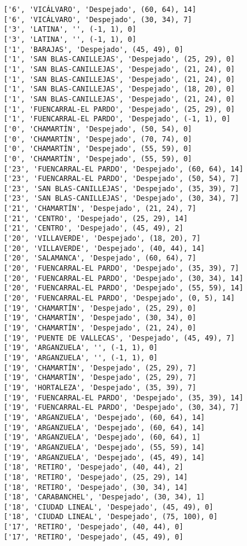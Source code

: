 \documentclass[11pt]{article}
\begin{document}
\begin{Verbatim}[commandchars=\\\{\}]
['6', 'VICÁLVARO', 'Despejado', (60, 64), 14]
['6', 'VICÁLVARO', 'Despejado', (30, 34), 7]
['3', 'LATINA', '', (-1, 1), 0]
['3', 'LATINA', '', (-1, 1), 0]
['1', 'BARAJAS', 'Despejado', (45, 49), 0]
['1', 'SAN BLAS-CANILLEJAS', 'Despejado', (25, 29), 0]
['1', 'SAN BLAS-CANILLEJAS', 'Despejado', (21, 24), 0]
['1', 'SAN BLAS-CANILLEJAS', 'Despejado', (21, 24), 0]
['1', 'SAN BLAS-CANILLEJAS', 'Despejado', (18, 20), 0]
['1', 'SAN BLAS-CANILLEJAS', 'Despejado', (21, 24), 0]
['1', 'FUENCARRAL-EL PARDO', 'Despejado', (25, 29), 0]
['1', 'FUENCARRAL-EL PARDO', 'Despejado', (-1, 1), 0]
['0', 'CHAMARTÍN', 'Despejado', (50, 54), 0]
['0', 'CHAMARTÍN', 'Despejado', (70, 74), 0]
['0', 'CHAMARTÍN', 'Despejado', (55, 59), 0]
['0', 'CHAMARTÍN', 'Despejado', (55, 59), 0]
['23', 'FUENCARRAL-EL PARDO', 'Despejado', (60, 64), 14]
['23', 'FUENCARRAL-EL PARDO', 'Despejado', (50, 54), 7]
['23', 'SAN BLAS-CANILLEJAS', 'Despejado', (35, 39), 7]
['23', 'SAN BLAS-CANILLEJAS', 'Despejado', (30, 34), 7]
['21', 'CHAMARTÍN', 'Despejado', (21, 24), 7]
['21', 'CENTRO', 'Despejado', (25, 29), 14]
['21', 'CENTRO', 'Despejado', (45, 49), 2]
['20', 'VILLAVERDE', 'Despejado', (18, 20), 7]
['20', 'VILLAVERDE', 'Despejado', (40, 44), 14]
['20', 'SALAMANCA', 'Despejado', (60, 64), 7]
['20', 'FUENCARRAL-EL PARDO', 'Despejado', (35, 39), 7]
['20', 'FUENCARRAL-EL PARDO', 'Despejado', (30, 34), 14]
['20', 'FUENCARRAL-EL PARDO', 'Despejado', (55, 59), 14]
['20', 'FUENCARRAL-EL PARDO', 'Despejado', (0, 5), 14]
['19', 'CHAMARTÍN', 'Despejado', (25, 29), 0]
['19', 'CHAMARTÍN', 'Despejado', (30, 34), 0]
['19', 'CHAMARTÍN', 'Despejado', (21, 24), 0]
['19', 'PUENTE DE VALLECAS', 'Despejado', (45, 49), 7]
['19', 'ARGANZUELA', '', (-1, 1), 0]
['19', 'ARGANZUELA', '', (-1, 1), 0]
['19', 'CHAMARTÍN', 'Despejado', (25, 29), 7]
['19', 'CHAMARTÍN', 'Despejado', (25, 29), 7]
['19', 'HORTALEZA', 'Despejado', (35, 39), 7]
['19', 'FUENCARRAL-EL PARDO', 'Despejado', (35, 39), 14]
['19', 'FUENCARRAL-EL PARDO', 'Despejado', (30, 34), 7]
['19', 'ARGANZUELA', 'Despejado', (60, 64), 14]
['19', 'ARGANZUELA', 'Despejado', (60, 64), 14]
['19', 'ARGANZUELA', 'Despejado', (60, 64), 1]
['19', 'ARGANZUELA', 'Despejado', (55, 59), 14]
['19', 'ARGANZUELA', 'Despejado', (45, 49), 14]
['18', 'RETIRO', 'Despejado', (40, 44), 2]
['18', 'RETIRO', 'Despejado', (25, 29), 14]
['18', 'RETIRO', 'Despejado', (30, 34), 14]
['18', 'CARABANCHEL', 'Despejado', (30, 34), 1]
['18', 'CIUDAD LINEAL', 'Despejado', (45, 49), 0]
['18', 'CIUDAD LINEAL', 'Despejado', (75, 100), 0]
['17', 'RETIRO', 'Despejado', (40, 44), 0]
['17', 'RETIRO', 'Despejado', (45, 49), 0]

\end{Verbatim}
\end{document}
